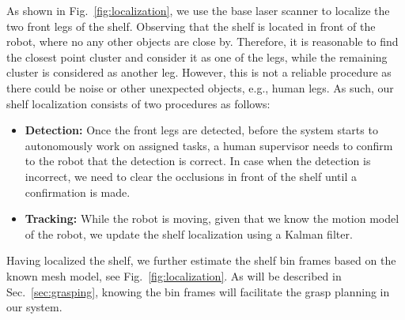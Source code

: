 As shown in Fig.~\ref{fig:localization}, we use the base laser scanner to localize the two front legs of the shelf. Observing that the shelf is located in front of the robot, where no any other objects are close by. Therefore, it is reasonable to find the closest point cluster and consider it as one of the legs, while the remaining cluster is considered as another leg. However, this is not a reliable procedure as there could be noise or other unexpected objects, e.g., human legs. As such, our shelf localization consists of two procedures as follows:

\begin{itemize}
 \item \textbf{Detection:} Once the front legs are detected, before the system starts to autonomously work on assigned tasks, a human supervisor needs to confirm to the robot that the detection is correct. In case when the detection is incorrect, we need to clear the occlusions in front of the shelf until a confirmation is made.
 \item \textbf{Tracking:} While the robot is moving, given that we know the motion model of the robot, we update the shelf localization using a Kalman filter.
\end{itemize}

Having localized the shelf, we further estimate the shelf bin frames based on the known mesh model, see Fig.~\ref{fig:localization}. As will be described in Sec.~\ref{sec:grasping}, knowing the bin frames will facilitate the grasp planning in our system.